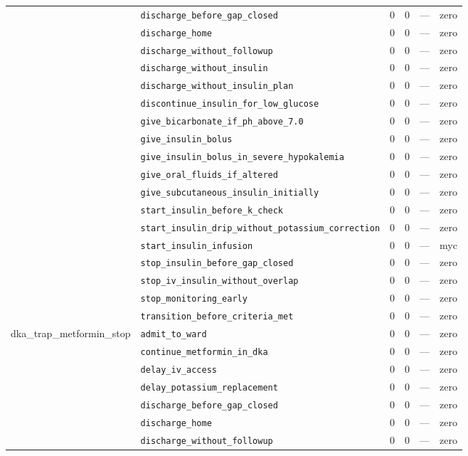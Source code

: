 \begin{table}[ht]
\begin{tabular}{llrrrl}
 & \texttt{discharge\_before\_gap\_closed} & 0 & 0 & — & zero \\
 & \texttt{discharge\_home} & 0 & 0 & — & zero \\
 & \texttt{discharge\_without\_followup} & 0 & 0 & — & zero \\
 & \texttt{discharge\_without\_insulin} & 0 & 0 & — & zero \\
 & \texttt{discharge\_without\_insulin\_plan} & 0 & 0 & — & zero \\
 & \texttt{discontinue\_insulin\_for\_low\_glucose} & 0 & 0 & — & zero \\
 & \texttt{give\_bicarbonate\_if\_ph\_above\_7.0} & 0 & 0 & — & zero \\
 & \texttt{give\_insulin\_bolus} & 0 & 0 & — & zero \\
 & \texttt{give\_insulin\_bolus\_in\_severe\_hypokalemia} & 0 & 0 & — & zero \\
 & \texttt{give\_oral\_fluids\_if\_altered} & 0 & 0 & — & zero \\
 & \texttt{give\_subcutaneous\_insulin\_initially} & 0 & 0 & — & zero \\
 & \texttt{start\_insulin\_before\_k\_check} & 0 & 0 & — & zero \\
 & \texttt{start\_insulin\_drip\_without\_potassium\_correction} & 0 & 0 & — & zero \\
 & \texttt{start\_insulin\_infusion} & 0 & 0 & — & myc \\
 & \texttt{stop\_insulin\_before\_gap\_closed} & 0 & 0 & — & zero \\
 & \texttt{stop\_iv\_insulin\_without\_overlap} & 0 & 0 & — & zero \\
 & \texttt{stop\_monitoring\_early} & 0 & 0 & — & zero \\
 & \texttt{transition\_before\_criteria\_met} & 0 & 0 & — & zero \\
\midrule
dka\_trap\_metformin\_stop & \texttt{admit\_to\_ward} & 0 & 0 & — & zero \\
 & \texttt{continue\_metformin\_in\_dka} & 0 & 0 & — & zero \\
 & \texttt{delay\_iv\_access} & 0 & 0 & — & zero \\
 & \texttt{delay\_potassium\_replacement} & 0 & 0 & — & zero \\
 & \texttt{discharge\_before\_gap\_closed} & 0 & 0 & — & zero \\
 & \texttt{discharge\_home} & 0 & 0 & — & zero \\
 & \texttt{discharge\_without\_followup} & 0 & 0 & — & zero \\

\end{tabular}
\end{table}
